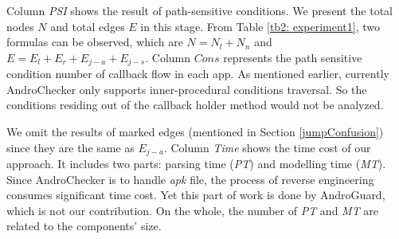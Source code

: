 %
Column \textit{PSI} shows the result of path-sensitive conditions. We present the total nodes $N$ and total edges $E$ in this stage. From Table \ref{tb2: experiment1}, two formulas can be observed, which are $N = N_{l} + N_{n}$ and $E = E_{l} + E_{r} + E_{j-a} + E_{j-s}$. Column $Cons$ represents the path sensitive condition number of callback flow in each app. As mentioned earlier, currently AndroChecker only supports inner-procedural conditions traversal. So the conditions residing out of the callback holder method would not be analyzed. 

We omit the results of marked edges (mentioned in Section \ref{jumpConfusion}) since they are the same as $E_{j-a}$. Column \textit{Time} shows the time cost of our approach. It includes two parts: parsing time (\textit{PT}) and modelling time (\textit{MT}). Since AndroChecker is to handle \textit{apk} file, the process of reverse engineering consumes significant time cost. Yet this part of work is done by AndroGuard, which is not our contribution. On the whole, the number of \textit{PT} and \textit{MT} are related to the components' size. 

